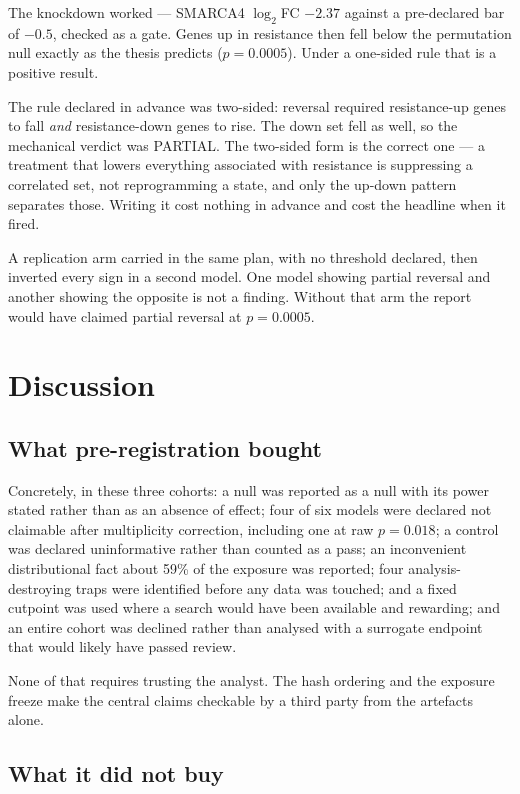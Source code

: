 \documentclass[11pt,a4paper]{article}
\begin{document}
The knockdown worked --- SMARCA4 $\log_2$FC $-2.37$ against a pre-declared bar of $-0.5$, checked as a
gate. Genes up in resistance then fell below the permutation null exactly as the thesis predicts
($p = 0.0005$). Under a one-sided rule that is a positive result.

The rule declared in advance was two-sided: reversal required resistance-up genes to fall \emph{and}
resistance-down genes to rise. The down set fell as well, so the mechanical verdict was PARTIAL. The
two-sided form is the correct one --- a treatment that lowers everything associated with resistance is
suppressing a correlated set, not reprogramming a state, and only the up-down pattern separates
those. Writing it cost nothing in advance and cost the headline when it fired.

A replication arm carried in the same plan, with no threshold declared, then inverted every sign in a
second model. One model showing partial reversal and another showing the opposite is not a finding.
Without that arm the report would have claimed partial reversal at $p = 0.0005$.

\section{Discussion}

\subsection{What pre-registration bought}

Concretely, in these three cohorts: a null was reported as a null with its power stated rather than
as an absence of effect; four of six models were declared not claimable after multiplicity
correction, including one at raw $p = 0.018$; a control was declared uninformative rather than
counted as a pass; an inconvenient distributional fact about 59\% of the exposure was reported;
four analysis-destroying traps were identified before any data was touched; and a fixed cutpoint
was used where a search would have been available and rewarding; and an entire cohort was
declined rather than analysed with a surrogate endpoint that would likely have passed review.

None of that requires trusting the analyst. The hash ordering and the exposure freeze make the
central claims checkable by a third party from the artefacts alone.

\subsection{What it did not buy}
\end{document}
